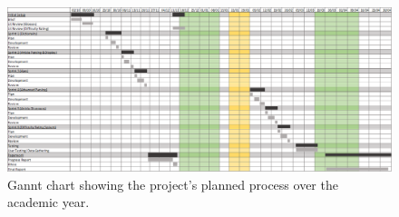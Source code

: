\begin{figure}
	\caption[Gannt Chart of the Project]{Gannt chart showing the project's planned process over the academic year.}
	\label{fig:gannt}
	\begin{center}
	\includegraphics[width=\textwidth]{Graphics/Gannt}
	\end{center}
\end{figure}
